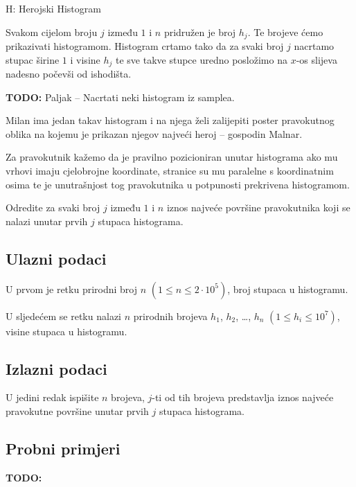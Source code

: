 \begin{statement}[
  timelimit=1 s,
  memorylimit=512 MiB,
]{H: Herojski Histogram}

Svakom cijelom broju $j$ između $1$ i $n$ pridružen je broj $h_j$. Te brojeve
ćemo prikazivati histogramom. Histogram crtamo tako da za svaki broj $j$
nacrtamo stupac širine $1$ i visine $h_j$ te sve takve stupce uredno posložimo
na $x$-os slijeva nadesno počevši od ishodišta.

\textbf{TODO:} Paljak -- Nacrtati neki histogram iz samplea.

Milan ima jedan takav histogram i na njega želi zalijepiti poster pravokutnog
oblika na kojemu je prikazan njegov najveći heroj -- gospodin Malnar.

Za pravokutnik kažemo da je pravilno pozicioniran unutar histograma ako mu
vrhovi imaju cjelobrojne koordinate, stranice su mu paralelne s koordinatnim
osima te je unutrašnjost tog pravokutnika u potpunosti prekrivena histogramom.

Odredite za svaki broj $j$ između $1$ i $n$ iznos najveće površine pravokutnika
koji se nalazi unutar prvih $j$ stupaca histograma.

\subsection*{Ulazni podaci}
U prvom je retku prirodni broj $n$ $(1 \le n \le 2 \cdot 10^5)$,  broj stupaca u
histogramu.

U sljedećem se retku nalazi $n$ prirodnih brojeva $h_1$, $h_2$, \dots, $h_n$
$(1 \le h_i \le 10^7)$, visine stupaca u histogramu.


\subsection*{Izlazni podaci}
U jedini redak ispišite $n$ brojeva, $j$-ti od tih brojeva predstavlja iznos
najveće pravokutne površine unutar prvih $j$ stupaca histograma.

\subsection*{Probni primjeri}
\textbf{TODO:}

\end{statement}

